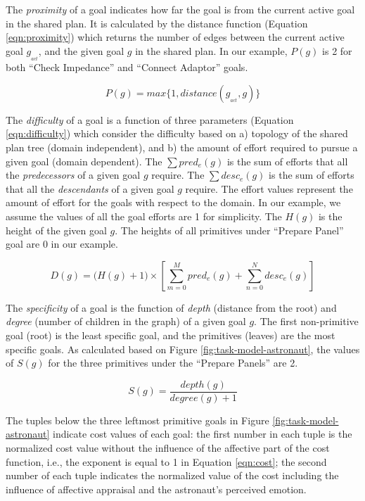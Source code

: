 \documentclass[12pt]{report}
\begin{document}
The \textit{proximity} of a goal indicates how far the goal is from the current
active goal in the shared plan. It is calculated by the distance function
(Equation \ref{eqn:proximity}) which returns the number of edges between the
current active goal $g_{_{act}}$, and the given goal $g$ in the shared plan. In
our example, $P(g)$ is 2 for both ``Check Impedance'' and ``Connect Adaptor''
goals.

\begin{equation}
P(g) = max\big\{1, distance(g_{_{act}},g)\big\}
\label{eqn:proximity}
\end{equation}

The \textit{difficulty} of a goal is a function of three parameters (Equation
\ref{eqn:difficulty}) which consider the difficulty based on a) topology of the
shared plan tree (domain independent), and b) the amount of effort required to
pursue a given goal (domain dependent). The $\sum pred_e(g)$ is the sum of
efforts that all the \textit{predecessors} of a given goal $g$ require. The
$\sum desc_e(g)$ is the sum of efforts that all the \textit{descendants} of a
given goal $g$ require. The effort values represent the amount of effort for the
goals with respect to the domain. In our example, we assume the values of all
the goal efforts are 1 for simplicity. The $H(g)$ is the height of the given
goal $g$. The heights of all primitives under ``Prepare Panel'' goal are 0 in
our example.

\begin{equation}
D(g) = \Big(H(g)+1\Big)\times\left[\sum\limits_{m=0}^{M} pred_e(g) +
\sum\limits_{n=0}^{N} desc_e(g)\right]
\label{eqn:difficulty}
\end{equation}

The \textit{specificity} of a goal is the function of \textit{depth} (distance
from the root) and \textit{degree} (number of children in the graph) of a given
goal $g$. The first non-primitive goal (root) is the least specific goal, and
the primitives (leaves) are the most specific goals. As calculated based on
Figure \ref{fig:task-model-astronaut}, the values of $S(g)$ for the three
primitives under the ``Prepare Panels'' are 2.

\begin{equation}
S(g) = \frac{depth(g)}{degree(g)+1}
\label{eqn:specificity}
\end{equation}

The tuples below the three leftmost primitive goals in Figure
\ref{fig:task-model-astronaut} indicate cost values of each goal: the first
number in each tuple is the normalized cost value without the influence of the
affective part of the cost function, i.e., the exponent is equal to 1 in
Equation \ref{eqn:cost}; the second number of each tuple indicates the
normalized value of the cost including the influence of affective appraisal and
the astronaut's perceived emotion.
\end{document}
